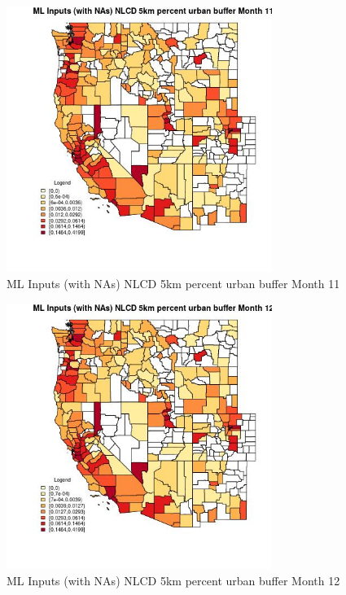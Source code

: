 \begin{figure} 
\centering  
\includegraphics[width=0.77\textwidth]{Code_Outputs/Report_ML_input_PM25_Step4_part_e_de_duplicated_aves_compiled_2019-05-21wNAs_CountyNLCD_5km_percent_urban_buffermedianMonth11.jpg} 
\caption{\label{fig:Report_ML_input_PM25_Step4_part_e_de_duplicated_aves_compiled_2019-05-21wNAsCountyNLCD_5km_percent_urban_buffermedianMonth11}ML Inputs (with NAs) NLCD 5km percent urban buffer Month 11} 
\end{figure} 
 

\begin{figure} 
\centering  
\includegraphics[width=0.77\textwidth]{Code_Outputs/Report_ML_input_PM25_Step4_part_e_de_duplicated_aves_compiled_2019-05-21wNAs_CountyNLCD_5km_percent_urban_buffermedianMonth12.jpg} 
\caption{\label{fig:Report_ML_input_PM25_Step4_part_e_de_duplicated_aves_compiled_2019-05-21wNAsCountyNLCD_5km_percent_urban_buffermedianMonth12}ML Inputs (with NAs) NLCD 5km percent urban buffer Month 12} 
\end{figure} 
 

